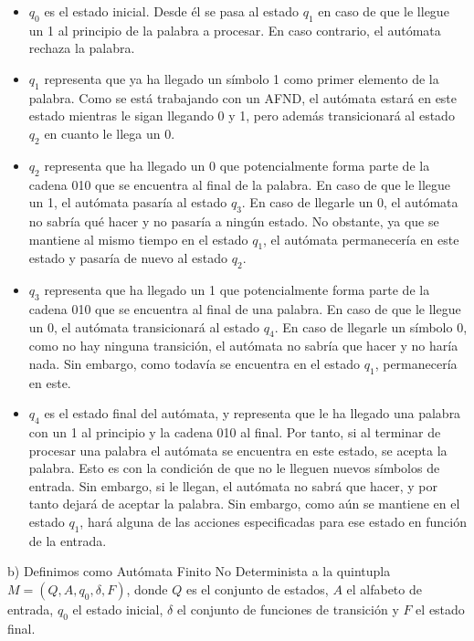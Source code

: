 \documentclass[11pt,a4paper]{article}
\begin{document}
		\begin{itemize}
			\item $q_0$ es el estado inicial. Desde él se pasa al estado $q_1$ en caso de que le llegue un 1 al principio
			de la palabra a procesar. En caso contrario, el autómata rechaza la palabra.
			\item $q_1$ representa que ya ha llegado un símbolo 1 como primer elemento de la palabra. Como se está trabajando
			con un AFND, el autómata estará en este estado mientras le sigan llegando 0 y 1, pero además transicionará al
			estado $q_2$ en cuanto le llega un 0.
			\item $q_2$ representa que ha llegado un 0 que potencialmente forma parte de la cadena 010 que se encuentra
			al final de la palabra. En caso de que le llegue un 1, el autómata pasaría al estado $q_3$. En caso de llegarle
			un 0, el autómata no sabría qué hacer y no pasaría a ningún estado. No obstante, ya que se mantiene al mismo
			tiempo en el estado $q_1$, el autómata permanecería en este estado y pasaría de nuevo al estado $q_2$.
			\item $q_3$ representa que ha llegado un 1 que potencialmente forma parte de la cadena 010 que se encuentra
			al final de una palabra. En caso de que le llegue un 0, el autómata transicionará al estado $q_4$. En caso
			de llegarle un símbolo 0, como no hay ninguna transición, el autómata no sabría que hacer y no haría nada.
			Sin embargo, como todavía se encuentra en el estado $q_1$, permanecería en este.
			\item $q_4$ es el estado final del autómata, y representa que le ha llegado una palabra con un 1 al principio
			y la cadena 010 al final. Por tanto, si al terminar de procesar una palabra el autómata se encuentra en este
			estado, se acepta la palabra. Esto es con la condición de que no le lleguen nuevos símbolos de entrada. Sin
			embargo, si le llegan, el autómata no sabrá que hacer, y por tanto dejará de aceptar la palabra. Sin embargo,
			como aún se mantiene en el estado $q_1$, hará alguna de las acciones especificadas para ese estado en función
			de la entrada.
		\end{itemize}
		
		b) Definimos como Autómata Finito No Determinista a la quintupla $M = (Q, A, q_0, \delta, F)$, donde $Q$ es
		el conjunto de estados, $A$ el alfabeto de entrada, $q_0$ el estado inicial, $\delta$ el conjunto de funciones
		de transición y $F$ el estado final. \par
		
\end{document}
